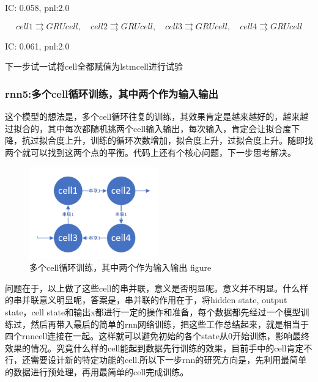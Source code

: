 \documentclass[11pt]{ctexart}
\begin{document}
{\kaishu \small IC: 0.058, pnl:2.0}

$$cell1 \rightrightarrows GRUcell, \quad cell2 \rightrightarrows GRUcell, \quad cell3 \rightrightarrows GRUcell, \quad cell4 \rightrightarrows GRUcell$$

{\kaishu \small IC: 0.061, pnl:2.0}

下一步试一试将cell全都赋值为lstmcell进行试验

\subsubsection{rnn5:多个cell循环训练，其中两个作为输入输出}
这个模型的想法是，多个cell循环往复的训练，其效果肯定是越来越好的，越来越过拟合的，其中每次都随机挑两个cell输入输出，每次输入，肯定会让拟合度下降，抗过拟合度上升，训练的循环次数增加，拟合度上升，过拟合度上升。随即找两个就可以找到这两个点的平衡。代码上还有个核心问题，下一步思考解决。
\begin{figure}[H]
\begin{center}
\includegraphics[width=0.5\textwidth]{rnn5.PNG}
\end{center}
\caption{多个cell循环训练，其中两个作为输入输出 figure}
\label{FIG.24}
\end{figure}


问题在于，以上做了这些cell的串并联，意义是否明显呢。意义并不明显。什么样的串并联意义明显呢，答案是，串并联的作用在于，将hidden state, output state，cell state和输出x都进行一定的操作和准备，每个数据都先经过一个模型训练过，然后再带入最后的简单的rnn网络训练，把这些工作总结起来，就是相当于四个rnncell连接在一起。这样就可以避免初始的各个state从0开始训练，影响最终效果的情况。究竟什么样的cell能起到数据先行训练的效果，目前手中的cell肯定不行，还需要设计新的特定功能的cell.所以下一步rnn的研究方向是，先利用最简单的数据进行预处理，再用最简单的cell完成训练。
\end{document}
